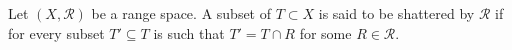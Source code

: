 \begin{definition}
	Let \((X, \mathcal{R})\) be a range space. A subset of \(T \subset X\) is
	said to be shattered by \(\mathcal{R}\) if for every subset \(T' \subseteq
	T \) is such that \(T' = T \cap R\) for some \(R \in \mathcal{R}\).
\end{definition}
